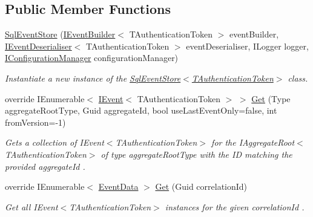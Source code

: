 \subsection*{Public Member Functions}
\begin{DoxyCompactItemize}
\item 
\hyperlink{classCqrs_1_1Events_1_1SqlEventStore_a15df78a1b12d2e3035b9715e9bfc8535_a15df78a1b12d2e3035b9715e9bfc8535}{Sql\+Event\+Store} (\hyperlink{interfaceCqrs_1_1Events_1_1IEventBuilder}{I\+Event\+Builder}$<$ T\+Authentication\+Token $>$ event\+Builder, \hyperlink{interfaceCqrs_1_1Events_1_1IEventDeserialiser}{I\+Event\+Deserialiser}$<$ T\+Authentication\+Token $>$ event\+Deserialiser, I\+Logger logger, \hyperlink{interfaceCqrs_1_1Configuration_1_1IConfigurationManager}{I\+Configuration\+Manager} configuration\+Manager)
\begin{DoxyCompactList}\small\item\em Instantiate a new instance of the \hyperlink{classCqrs_1_1Events_1_1SqlEventStore_a15df78a1b12d2e3035b9715e9bfc8535_a15df78a1b12d2e3035b9715e9bfc8535}{Sql\+Event\+Store$<$\+T\+Authentication\+Token$>$} class. \end{DoxyCompactList}\item 
override I\+Enumerable$<$ \hyperlink{interfaceCqrs_1_1Events_1_1IEvent}{I\+Event}$<$ T\+Authentication\+Token $>$ $>$ \hyperlink{classCqrs_1_1Events_1_1SqlEventStore_a7e32a08a015642a5bc1cefa6998e6f11_a7e32a08a015642a5bc1cefa6998e6f11}{Get} (Type aggregate\+Root\+Type, Guid aggregate\+Id, bool use\+Last\+Event\+Only=false, int from\+Version=-\/1)
\begin{DoxyCompactList}\small\item\em Gets a collection of I\+Event$<$\+T\+Authentication\+Token$>$ for the I\+Aggregate\+Root$<$\+T\+Authentication\+Token$>$ of type {\itshape aggregate\+Root\+Type}  with the ID matching the provided {\itshape aggregate\+Id} . \end{DoxyCompactList}\item 
override I\+Enumerable$<$ \hyperlink{classCqrs_1_1Events_1_1EventData}{Event\+Data} $>$ \hyperlink{classCqrs_1_1Events_1_1SqlEventStore_ac1fb2bdec07cbeec57fb3d985e7a8b31_ac1fb2bdec07cbeec57fb3d985e7a8b31}{Get} (Guid correlation\+Id)
\begin{DoxyCompactList}\small\item\em Get all I\+Event$<$\+T\+Authentication\+Token$>$ instances for the given {\itshape correlation\+Id} . \end{DoxyCompactList}\end{DoxyCompactItemize}
